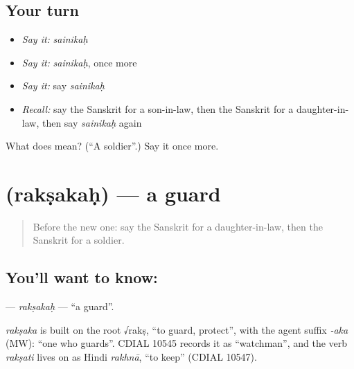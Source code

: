 \subsection*{Your turn}
\begin{itemize}
\raggedright
  \item \emph{Say it:} \emph{sainikaḥ}
  \item \emph{Say it:} \emph{sainikaḥ}, once more
  \item \emph{Say it:} say \emph{sainikaḥ}
  \item \emph{Recall:} say the Sanskrit for a son-in-law, then the Sanskrit for a daughter-in-law, then say \emph{sainikaḥ} again
\end{itemize}

\begin{tcolorbox}[breakable,colback=teal!4,colframe=teal!35!black,title={Before you move on}]
What does  mean? (\textquotedblleft{}A soldier\textquotedblright{}.) Say it once more.
\end{tcolorbox}
\section[\texorpdfstring{\sk{रक्षकः} (rakṣakaḥ)}{रक्षकः (rakṣakaḥ)}]{ (rakṣakaḥ) — a guard}

\label{lesson:SA-C179-raksakah}



\begin{quote}
Before the new one: say the Sanskrit for a daughter-in-law, then the Sanskrit for a soldier.
\end{quote}

\subsection*{You'll want to know: }
\textbf{} — \emph{rakṣakaḥ} — \textquotedblleft{}a guard\textquotedblright{}.

\begin{cousinweb}
\emph{rakṣaka} is built on the root √rakṣ, \textquotedblleft{}to guard, protect\textquotedblright{}, with the agent suffix \emph{-aka} (MW): \textquotedblleft{}one who guards\textquotedblright{}. CDIAL 10545 records it as \textquotedblleft{}watchman\textquotedblright{}, and the verb \emph{rakṣati} lives on as Hindi \emph{rakhnā}, \textquotedblleft{}to keep\textquotedblright{} (CDIAL 10547).
\end{cousinweb}

